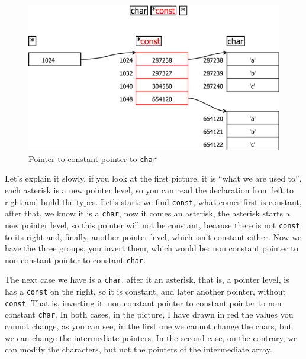 \documentclass[a4paper]{article}
\begin{document}
\begin{figure}[H]
    \includegraphics[width=\linewidth]{char_pointer_const_pointer}
    \caption{Pointer to constant pointer to \texttt{char}}
    \label{img:charconstpointerpointer}
\end{figure}

Let's explain it slowly, if you look at the first picture, it is ``what we are
used to'', each asterisk is a new pointer level, so you can read the declaration
from left to right and build the types. Let's start: we find \verb"const",
what comes first is constant, after that, we know it is a \verb!char!, now it
comes an asterisk, the asterisk starts a new pointer level, so this pointer will
not be constant, because there is not \verb!const! to its right and, finally,
another pointer level, which isn't constant either. Now we have the three
groups, you invert them, which would be: non constant pointer to non constant
pointer to constant \verb!char!.

The next case we have is a \verb!char!, after it an asterisk, that is, a pointer
level, is has a \verb"const" on the right, so it is constant, and later another
pointer, without \verb"const". That is, inverting it: non constant pointer to
constant pointer to non constant \verb"char". In both cases, in the picture, I
have drawn in red the values you cannot change, as you can see, in the first one
we cannot change the chars, but we can change the intermediate pointers. In
the second case, on the contrary, we can modify the characters, but not the
pointers of the intermediate array.
\end{document}
